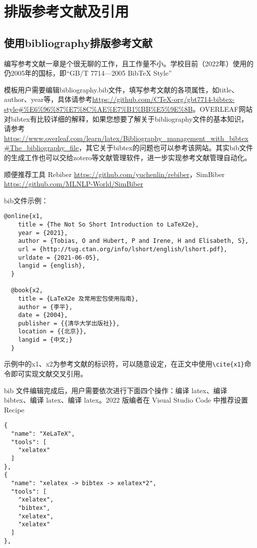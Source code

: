 \section{排版参考文献及引用}\label{sec:ref}

\subsection{使用bibliography排版参考文献}

编写参考文献一章是个很无聊的工作，且工作量不小。学校目前（2022年）使用的仍2005年的国标，即“GB/T 7714—2005 BibTeX Style”

模板用户需要编辑bibliography.bib文件，填写参考文献的各项属性，如title、author、year等，具体请参考\url{https://github.com/CTeX-org/gbt7714-bibtex-style#%E6%96%87%E7%8C%AE%E7%B1%BB%E5%9E%8B}。OVERLEAF网站对bibtex有比较详细的解释，如果您想要了解关于bibliography文件的基本知识，请参考\url{https://www.overleaf.com/learn/latex/Bibliography_management_with_bibtex#The_bibliography_file}，其它关于bibtex的问题也可以参考该网站。其实bib文件的生成工作也可以交给zotero等文献管理软件，进一步实现参考文献管理自动化。

顺便推荐工具 Rebiber \url{https://github.com/yuchenlin/rebiber}，SimBiber \url{https://github.com/MLNLP-World/SimBiber}

bib文件示例：
{
\color{green!50!black}
\begin{lstlisting}[breaklines=true,]
  @online{x1,
    title = {The Not So Short Introduction to LaTeX2e},
    year = {2021},
    author = {Tobias, O and Hubert, P and Irene, H and Elisabeth, S},
    url = {http://tug.ctan.org/info/lshort/english/lshort.pdf},
    urldate = {2021-06-05},
    langid = {english},
  }
  
  @book{x2,
    title = {LaTeX2e 及常用宏包使用指南},
    author = {李平},
    date = {2004},
    publisher = {{清华大学出版社}},
    location = {{北京}},
    langid = {中文;}
  }
\end{lstlisting}
}

示例中的x1、x2为参考文献的标识符，可以随意设定，在正文中使用\verb|\cite{x1}|命令即可实现文献交叉引用。

bib 文件编辑完成后，用户需要依次进行下面四个操作：编译 latex、编译 bibtex、编译 latex、编译 latex。2022 版编者在 Visual Studio Code 中推荐设置 Recipe

{
\color{green!50!black}
\begin{lstlisting}[breaklines=true,]
{
  "name": "XeLaTeX",
  "tools": [
    "xelatex"
  ]
},
{
  "name": "xelatex -> bibtex -> xelatex*2",
  "tools": [
    "xelatex",
    "bibtex",
    "xelatex",
    "xelatex"
  ]
},
\end{lstlisting}
}

